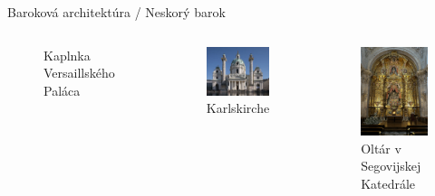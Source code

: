 \documentclass[dvipsnames]{beamer}
\begin{document}
\begin{frame}{\small \textcolor{g}{Baroková architektúra} / \Large Neskorý barok}
\begin{columns}
\begin{figure}
			\vskip 0.5mm
			\caption{\centering Kaplnka Versaillského Paláca}
		\end{figure}%
		\begin{figure}
			\includegraphics[scale=1.5]{karlskirchw}
			\caption{\centering Karlskirche}
		\end{figure}%
		\begin{figure}
			\includegraphics[scale=0.1]{ultra}
			\vskip 0.5mm
			\caption{\centering Oltár v Segovijskej Katedrále}
		\end{figure}%


	\end{columns}

\end{frame}
\end{document}
